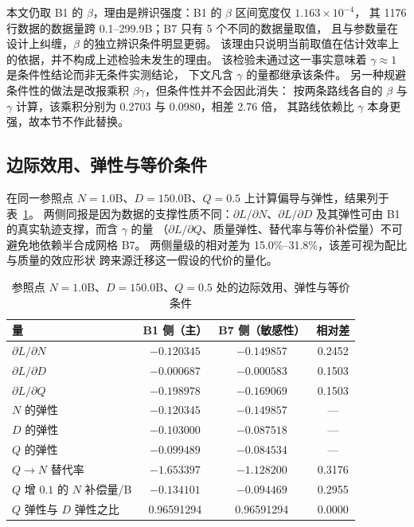 本文仍取 B1 的 $\beta$，理由是辨识强度：B1 的 $\beta$ 区间宽度仅 $1.163\times10^{-4}$，
其 1176 行数据的数据量跨 0.1--299.9B；B7 只有 5 个不同的数据量取值，
且与参数量在设计上纠缠，$\beta$ 的独立辨识条件明显更弱。
该理由只说明当前取值在估计效率上的依据，并不构成上述检验未发生的理由。
该检验未通过这一事实意味着 $\gamma\approx1$ 是条件性结论而非无条件实测结论，
下文凡含 $\gamma$ 的量都继承该条件。
另一种规避条件性的做法是改报乘积 $\beta\gamma$，但条件性并不会因此消失：
按两条路线各自的 $\beta$ 与 $\gamma$ 计算，该乘积分别为 0.2703 与 0.0980，相差 2.76 倍，
其路线依赖比 $\gamma$ 本身更强，故本节不作此替换。

\subsection{边际效用、弹性与等价条件}
\label{subsec:q2-marginal}

在同一参照点 $N=1.0$B、$D=150.0$B、$Q=0.5$ 上计算偏导与弹性，结果列于表~\ref{tab:q2-elasticity}。
两侧同报是因为数据的支撑性质不同：$\partial L/\partial N$、$\partial L/\partial D$
及其弹性可由 B1 的真实轨迹支撑，而含 $\gamma$ 的量
（$\partial L/\partial Q$、质量弹性、替代率与等价补偿量）不可避免地依赖半合成网格 B7。
两侧量级的相对差为 15.0\%--31.8\%，该差可视为配比与质量的效应形状
跨来源迁移这一假设的代价的量化。

\begin{table}[H]
  \centering
  \caption{参照点 $N=1.0$B、$D=150.0$B、$Q=0.5$ 处的边际效用、弹性与等价条件}
  \label{tab:q2-elasticity}
  \begin{tabular}{@{}lccc@{}}
    \toprule
    量 & B1 侧（主） & B7 侧（敏感性） & 相对差 \\
    \midrule
    $\partial L/\partial N$            & $-0.120345$ & $-0.149857$ & 0.2452 \\
    $\partial L/\partial D$            & $-0.000687$ & $-0.000583$ & 0.1503 \\
    $\partial L/\partial Q$            & $-0.198978$ & $-0.169069$ & 0.1503 \\
    $N$ 的弹性                          & $-0.120345$ & $-0.149857$ & --- \\
    $D$ 的弹性                          & $-0.103000$ & $-0.087518$ & --- \\
    $Q$ 的弹性                          & $-0.099489$ & $-0.084534$ & --- \\
    $Q\!\to\!N$ 替代率                  & $-1.653397$ & $-1.128200$ & 0.3176 \\
    $Q$ 增 $0.1$ 的 $N$ 补偿量/B        & $-0.134101$ & $-0.094469$ & 0.2955 \\
    $Q$ 弹性与 $D$ 弹性之比             & 0.96591294  & 0.96591294  & 0.0000 \\
    \bottomrule
  \end{tabular}
\end{table}


